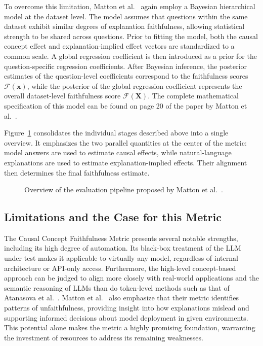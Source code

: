 To overcome this limitation, Matton et al.~\cite{mattonWalkTalkMeasuring2024} again employ a Bayesian hierarchical model at the dataset level. The model assumes that questions within the same dataset exhibit similar degrees of explanation faithfulness, allowing statistical strength to be shared across questions. Prior to fitting the model, both the causal concept effect and explanation-implied effect vectors are standardized to a common scale. A global regression coefficient is then introduced as a prior for the question-specific regression coefficients. After Bayesian inference, the posterior estimates of the question-level coefficients correspond to the faithfulness scores $\mathcal{F}(\mathbf{x})$, while the posterior of the global regression coefficient represents the overall dataset-level faithfulness score $\mathcal{F}(\mathbf{X})$. The complete mathematical specification of this model can be found on page 20 of the paper by Matton et al.~\cite{mattonWalkTalkMeasuring2024}.

Figure~\ref{fig:matton_evaluation_pipeline} consolidates the individual stages described above into a single overview. It emphasizes the two parallel quantities at the center of the metric: model answers are used to estimate causal effects, while natural-language explanations are used to estimate explanation-implied effects. Their alignment then determines the final faithfulness estimate.

\begin{figure}[p]
	\centering
	
	\caption[Evaluation pipeline proposed by Matton et al.]{Overview of the evaluation pipeline proposed by Matton et al.~\cite{mattonWalkTalkMeasuring2024}.}
	\label{fig:matton_evaluation_pipeline}
\end{figure}
\FloatBarrier

\subsection{Limitations and the Case for this Metric}
\label{sec:matton_limitations}
The Causal Concept Faithfulness Metric presents several notable strengths, including its high degree of automation. Its black-box treatment of the LLM under test makes it applicable to virtually any model, regardless of internal architecture or API-only access. Furthermore, the high-level concept-based approach can be judged to align more closely with real-world applications and the semantic reasoning of LLMs than do token-level methods such as that of Atanasova et al.~\cite{atanasovaFaithfulnessTestsNatural2023}. Matton et al.~\cite{mattonWalkTalkMeasuring2024} also emphasize that their metric identifies patterns of unfaithfulness, providing insight into how explanations mislead and supporting informed decisions about model deployment in given environments. This potential alone makes the metric a highly promising foundation, warranting the investment of resources to address its remaining weaknesses.

